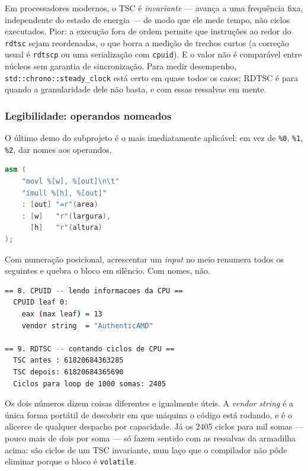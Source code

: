 \begin{armadilha}
Em processadores modernos, o TSC é \emph{invariante} --- avança a uma frequência
fixa, independente do estado de energia --- de modo que ele mede tempo, não
ciclos executados. Pior: a execução fora de ordem permite que instruções ao
redor do \texttt{rdtsc} sejam reordenadas, o que borra a medição de trechos
curtos (a correção usual é \texttt{rdtscp} ou uma serialização com
\texttt{cpuid}). E o valor não é comparável entre núcleos sem garantia de
sincronização. Para medir desempenho, \texttt{std::chrono::steady\_clock} está
certo em quase todos os casos; RDTSC é para quando a granularidade dele não
basta, e com essas ressalvas em mente.
\end{armadilha}

\subsubsection{Legibilidade: operandos nomeados}

O último demo do subprojeto é o mais imediatamente aplicável: em vez de
\texttt{\%0}, \texttt{\%1}, \texttt{\%2}, dar nomes aos operandos.

\begin{lstlisting}[style=bt, language=C++,
    caption={A mesma multiplicação, legível.}]
asm (
    "movl %[w], %[out]\n\t"
    "imull %[h], %[out]"
    : [out] "=r"(area)
    : [w]   "r"(largura),
      [h]   "r"(altura)
);
\end{lstlisting}

Com numeração posicional, acrescentar um \emph{input} no meio renumera todos os
seguintes e quebra o bloco em silêncio. Com nomes, não.

\begin{lstlisting}[style=bt, language=bash,
    caption={Saída medida de \texttt{dist/bin/inline\_asm} (recortada): CPUID e
             RDTSC lendo a máquina em que este relatório foi compilado.}]
== 8. CPUID -- lendo informacoes da CPU ==
  CPUID leaf 0:
    eax (max leaf) = 13
    vendor string  = "AuthenticAMD"

== 9. RDTSC -- contando ciclos de CPU ==
  TSC antes : 61820684363285
  TSC depois: 61820684365690
  Ciclos para loop de 1000 somas: 2405
\end{lstlisting}

Os dois números dizem coisas diferentes e igualmente úteis. A \emph{vendor
string} é a única forma portátil de descobrir em que máquina o código está
rodando, e é o alicerce de qualquer despacho por capacidade. Já os 2405 ciclos
para mil somas --- pouco mais de dois por soma --- só fazem sentido com as
ressalvas da armadilha acima: são ciclos de um TSC invariante, num laço que o
compilador não pôde eliminar porque o bloco é \texttt{volatile}.

